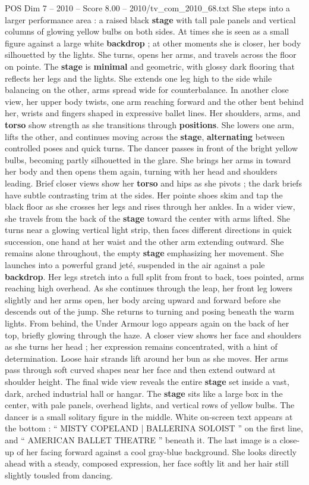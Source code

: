 \begin{textsample}{POS Dim 7 – 2010 – Score 8.00 – 2010/tv\_com\_2010\_68.txt}
She steps into a larger performance area : a raised black \textbf{stage} with tall pale panels and vertical columns of glowing yellow bulbs on both sides.
At times she is seen as a small figure against a large white \textbf{backdrop} ; at other moments she is closer, her body silhouetted by the lights.
She turns, opens her arms, and travels across the floor on pointe.
The \textbf{stage} is \textbf{minimal} and geometric, with glossy dark flooring that reflects her legs and the lights.
She extends one leg high to the side while balancing on the other, arms spread wide for counterbalance.
In another close view, her upper body twists, one arm reaching forward and the other bent behind her, wrists and fingers shaped in expressive ballet lines.
Her shoulders, arms, and \textbf{torso} show strength as she transitions through \textbf{positions}.
She lowers one arm, lifts the other, and continues moving across the \textbf{stage}, \textbf{alternating} between controlled poses and quick turns.
The dancer passes in front of the bright yellow bulbs, becoming partly silhouetted in the glare.
She brings her arms in toward her body and then opens them again, turning with her head and shoulders leading.
Brief closer views show her \textbf{torso} and hips as she pivots ; the dark briefs have subtle contrasting trim at the sides.
Her pointe shoes skim and tap the black floor as she crosses her legs and rises through her ankles.
In a wider view, she travels from the back of the \textbf{stage} toward the center with arms lifted.
She turns near a glowing vertical light strip, then faces different directions in quick succession, one hand at her waist and the other arm extending outward.
She remains alone throughout, the empty \textbf{stage} emphasizing her movement.
She launches into a powerful grand jeté, suspended in the air against a pale \textbf{backdrop}.
Her legs stretch into a full split from front to back, toes pointed, arms reaching high overhead.
As she continues through the leap, her front leg lowers slightly and her arms open, her body arcing upward and forward before she descends out of the jump.
She returns to turning and posing beneath the warm lights.
From behind, the Under Armour logo appears again on the back of her top, briefly glowing through the haze.
A closer view shows her face and shoulders as she turns her head ; her expression remains concentrated, with a hint of determination.
Loose hair strands lift around her bun as she moves.
Her arms pass through soft curved shapes near her face and then extend outward at shoulder height.
The final wide view reveals the entire \textbf{stage} set inside a vast, dark, arched industrial hall or hangar.
The \textbf{stage} sits like a large box in the center, with pale panels, overhead lights, and vertical rows of yellow bulbs.
The dancer is a small solitary figure in the middle.
White on-screen text appears at the bottom : “ MISTY COPELAND | BALLERINA SOLOIST ” on the first line, and “ AMERICAN BALLET THEATRE ” beneath it.
The last image is a close-up of her facing forward against a cool gray-blue background.
She looks directly ahead with a steady, composed expression, her face softly lit and her hair still slightly tousled from dancing.


\end{textsample}
